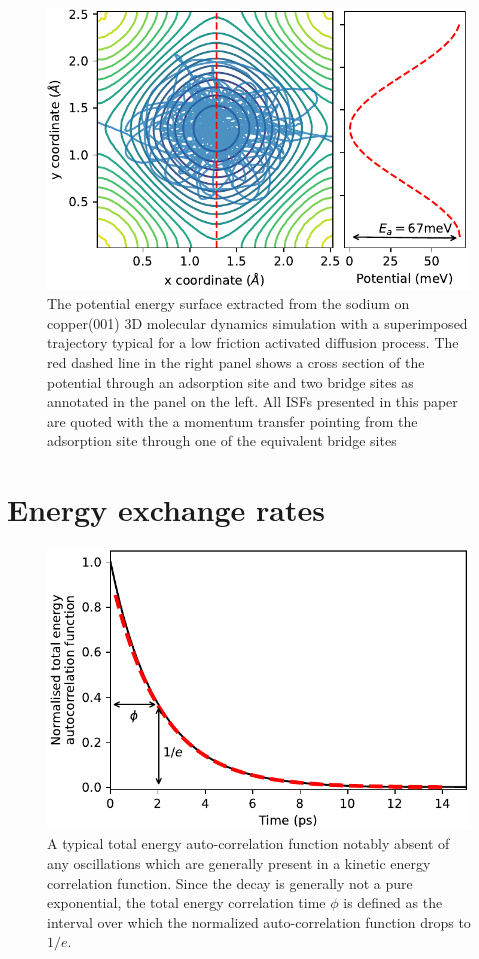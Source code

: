 \documentclass[7pt]{article}
\begin{document}
\begin{figure}
	\centering
	\includegraphics[width=1.0\columnwidth]{pot_surface}
	\caption{The potential energy surface extracted from the sodium on copper(001) 3D molecular dynamics simulation with a superimposed trajectory typical for a low friction activated diffusion process. The red dashed line in the right panel shows a cross section of the potential through an adsorption site and two bridge sites as annotated in the panel on the left. All ISFs presented in this paper are quoted with the a momentum transfer pointing from the adsorption site through one of the equivalent bridge sites}
	\label{fig:pot_surface}
\end{figure}

\section*{Energy exchange rates}

\begin{figure}
	\centering
	\includegraphics[width=1.0\columnwidth]{e_auto}
	\caption{A typical total energy auto-correlation function notably absent of any oscillations which are generally present in a kinetic energy correlation function. Since the decay is generally not a pure exponential, the total energy correlation time $\phi$ is defined as the interval over which the normalized auto-correlation function drops to $1/e$.}
	\label{fig:e_auto}
\end{figure}
\end{document}
